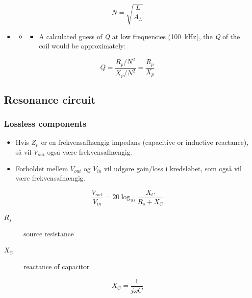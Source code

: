 \begin{equation}
N = \sqrt{\dfrac{L}{A_L}}
\end{equation}

\begin{itemize}
	\item[]
	\begin{itemize}
		\item[]
		\begin{itemize}
			\item A calculated guess of \textit{Q} at low frequencies (\SI{100}{\kilo\hertz}), the \textit{Q} of	the coil would be approximately:
		\end{itemize} 
	\end{itemize} 
\end{itemize}

\begin{equation}
Q = \dfrac{R_p/N^2}{X_p/N^2} = \dfrac{R_p}{X_p}
\end{equation}

\subsection{Resonance circuit}
\subsubsection{Lossless components}
\begin{itemize}
	\item Hvis $Z_p$ er en frekvensafhængig impedans (capacitive or inductive reactance), så vil $V_{out}$ også være frekvensafhængig.
	\item Forholdet mellem $V_{out}$ og $V_{in}$ vil udgøre gain/loss i kredsløbet, som også vil være frekvensafhængig. 
\end{itemize}

\begin{equation}
\dfrac{V_{out}}{V_{in}} = 20\log_{10}\dfrac{X_C}{R_s+X_C}
\end{equation}

\begin{description}
	\item[$R_s$] source resistance
	\item[$X_C$] reactance of capacitor
\end{description}

\begin{equation}
X_C=\dfrac{1}{j\omega C}
\end{equation}

